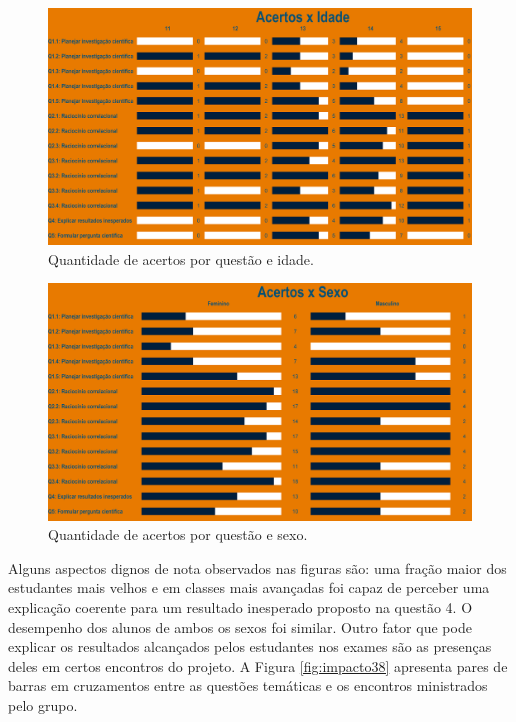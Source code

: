 \documentclass[
]{book}
\begin{document}
\begin{figure}

{\centering \includegraphics[width=0.75\linewidth,height=0.75\textheight]{images/Impactos/36} 

}

\caption{Quantidade de acertos por questão e idade.}\label{fig:impacto36}
\end{figure}

\begin{figure}

{\centering \includegraphics[width=0.75\linewidth,height=0.75\textheight]{images/Impactos/37} 

}

\caption{Quantidade de acertos por questão e sexo.}\label{fig:impacto37}
\end{figure}

Alguns aspectos dignos de nota observados nas figuras são: uma fração maior dos estudantes mais velhos e em classes mais avançadas foi capaz de perceber uma explicação coerente para um resultado inesperado proposto na questão 4. O desempenho dos alunos de ambos os sexos foi similar.
Outro fator que pode explicar os resultados alcançados pelos estudantes nos exames são as presenças deles em certos encontros do projeto. A Figura \ref{fig:impacto38} apresenta pares de barras em cruzamentos entre as questões temáticas e os encontros ministrados pelo grupo.
\end{document}
